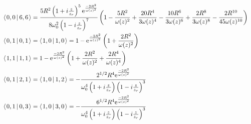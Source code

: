 \documentclass[11pt]{amsart}
\makeatletter
\newcommand{\e}{{\rm e}}				%
\newcommand{\msp}[1]{\mspace{#1mu}}		%
\newcommand{\0}{\varnothing}		%
\newcommand{\brac}[2]{\left\langle\msp{2} #1\left\lvert \msp{3.5} #2 \right.\right\rangle}	%
\newcommand{\1}{!}
\newcommand{\2}{@}
\newcommand{\3}{\#}
\newcommand{\4}{\$}
\newcommand{\5}{\%}
\newcommand{\6}{$^\wedge$}
\newcommand{\7}{\&}
\newcommand{\8}{*}
\newcommand{\9}{(}
\makeatother
\begin{document}
\begin{align*}
\\
&
\brac{0,0}{6,6} = \frac{5R^2\left(1+i\frac{z}{z_r}\right)^5\e^{\frac{-2R^2}{\omega(z)^2}}}{8\omega_0^2\left(1-i\frac{z}{z_r}\right)^7}\left(1-\frac{5R^2}{\omega(z)^2}+\frac{20R^4}{3\omega(z)^4}-\frac{10R^6}{3\omega(z)^6}+\frac{2R^8}{3\omega(z)^8}-\frac{2R^{10}}{45\omega(z)^{10}}\right)
\\
&\brac{0,1}{0,1} = \brac{1,0}{1,0} = 1-\e^{\frac{-2R^2}{\omega(z)^2}}\left(1+\frac{2R^2}{\omega(z)^2}\right)
\\
&\brac{1,1}{1,1} = 1-\e^{\frac{-2R^2}{\omega(z)^2}}\left(1+\frac{2R^2}{\omega(z)^2}+\frac{2R^4}{\omega(z)^4}\right)
\\
&
\brac{0,1}{2,1} = \brac{1,0}{1,2} = -\frac{2^{1/2}R^4\e^{\frac{-2R^2}{\omega(z)^2}}}{\omega_0^4\left(1+i\frac{z}{z_r}\right)\left(1-i\frac{z}{z_r}\right)^3}
\\
&
\brac{0,1}{0,3} = \brac{1,0}{3,0} = -\frac{6^{1/2}R^4\e^{\frac{-2R^2}{\omega(z)^2}}}{\omega_0^4\left(1+i\frac{z}{z_r}\right)\left(1-i\frac{z}{z_r}\right)^3}
\end{align*}
\end{document}
